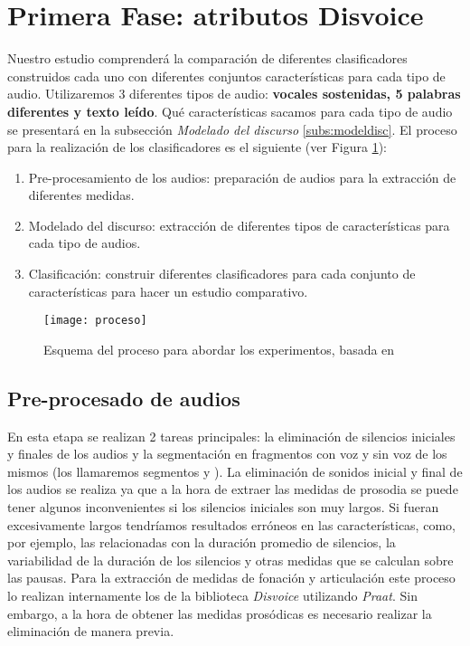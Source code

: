 \section{Primera Fase: atributos Disvoice}
Nuestro estudio comprenderá la comparación de diferentes clasificadores construidos cada uno con diferentes conjuntos características para cada tipo de audio. Utilizaremos 3 diferentes tipos de audio: \textbf{vocales sostenidas, 5 palabras diferentes y texto leído}. Qué características sacamos para cada tipo de audio se presentará en la subsección \textit{Modelado del discurso} \ref{subs:modeldisc}. El proceso para la realización de los clasificadores es el siguiente (ver Figura \ref{fig:proceso}):
\begin{enumerate}
\item Pre-procesamiento de los audios: preparación de audios para la extracción de diferentes medidas.
\item Modelado del discurso: extracción de diferentes tipos de características para cada tipo de audios.
\item Clasificación: construir diferentes clasificadores para cada conjunto de características para hacer un estudio comparativo.
\end{enumerate}

\begin{figure}[!h]
		\centering
		\texttt{[image: proceso]}
		\caption[Esquema del proceso para abordar los experimentos.]{Esquema del proceso para abordar los experimentos, basada en \cite{Orz2016}}\label{fig:proceso}
\end{figure}

\subsection{Pre-procesado de audios}
En esta etapa se realizan 2 tareas principales: la eliminación de silencios iniciales y finales de los audios y la segmentación en fragmentos con voz y sin voz de los mismos (los llamaremos segmentos  y ).
La eliminación de sonidos inicial y final de los audios se realiza ya que a la hora de extraer las medidas de prosodia se puede tener algunos inconvenientes si los silencios iniciales son muy largos. Si fueran excesivamente largos tendríamos resultados erróneos en las características, como, por ejemplo, las relacionadas con la duración promedio de silencios, la variabilidad de la duración de los silencios y otras medidas que se calculan sobre las pausas.
Para la extracción de medidas de fonación y articulación este proceso lo realizan internamente los  de la biblioteca \textit{Disvoice} \cite{neurospeech} utilizando \textit{Praat}. Sin embargo, a la hora de obtener las medidas prosódicas es necesario realizar la eliminación de manera previa.

